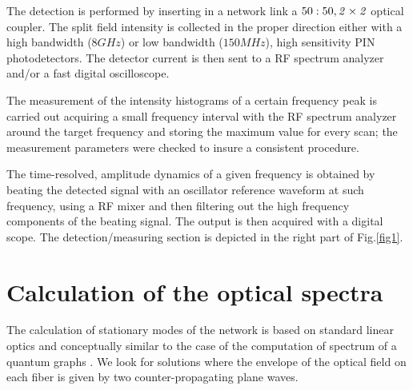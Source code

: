 \documentclass[aps,prl,twocolumn,showpacs,amsmath,amssymb,floatfix,superscriptaddress,
]{revtex4-1}
\begin{document}
The detection is performed by inserting in a network link a 
${50:50, \it 2\times2}$ optical coupler. The split field intensity is collected in the proper direction either with a high bandwidth ($8GHz$) or low bandwidth ($150MHz$), high sensitivity PIN photodetectors. The detector current is then sent to a RF spectrum analyzer and/or a fast digital oscilloscope. 

The measurement of the intensity histograms of a certain frequency peak is carried out acquiring a small frequency interval with the RF spectrum analyzer around the target frequency and storing the maximum value for every scan; the measurement parameters were checked to insure a consistent procedure.  

The time-resolved, amplitude dynamics of a given frequency is obtained by beating the detected signal with an oscillator reference waveform at such frequency, using a RF mixer and then filtering out the high frequency components of the beating signal. The output is then acquired with a digital scope. 
The detection/measuring section is depicted in the right part of Fig.\ref{fig1}.



\section{Calculation of the optical spectra} 

The calculation of stationary modes of 
the network is based on standard linear optics
and conceptually similar to the case of the computation of spectrum of
a quantum graphs \citep{kottos1999periodic,kottos2003quantum}.
We look for solutions where the envelope of the optical field on each
fiber is given by two counter-propagating plane waves. 
\end{document}
